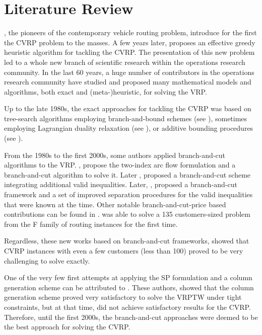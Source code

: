 \section{Literature Review}
\label{sec:intro-literature-review}

\textcite{dantzig1959},
the pioneers of the contemporary vehicle routing problem,
introduce for the first the CVRP problem to the masses.
A few years later, \textcite{clarke1964} proposes
an effective greedy heuristic algorithm for tackling the CVRP.
The presentation of this new problem led to a whole new branch
of scientific research within the operations research community.
In the last 60 years, a huge number of contributors in
the operations research community have studied and proposed many
mathematical models and algorithms, both exact and (meta-)heuristic,
for solving the VRP.

Up to the late 1980s, the exact approaches for tackling the CVRP was
based on tree-search algorithms employing branch-and-bound schemes
(see \textcite{pierce1969, christofides1969a, christofides1981, laporte1986}),
sometimes employing Lagrangian duality relaxation (see \textcite{fisher1994a, miller1995}),
or additive bounding procedures (see \textcite{fischetti1994a, hadjiconstantinou1995}).

From the 1980s to the first 2000s, some authors applied branch-and-cut
algorithms to the VRP.
\textcite{laporte1983, laporte1985}, propose the two-index arc flow formulation
and a branch-and-cut algorithm to solve it.
Later \textcite{augerat1995a}, proposed a branch-and-cut scheme
integrating additional valid inequalities.
Later, \textcite{lysgaard2004},
proposed a branch-and-cut framework and
a set of improved separation procedures for
the valid inequalities that were known at the time.
Other notable branch-and-cut-price based contributions
can be found in \textcite{araqueg1994, augerat1995, achuthan1996, blasum2000, ralphs2003, achuthan2003, baldacci2004}.
\citeauthor{baldacci2004} was able to solve a
135 customers-sized problem from the F family of routing instances \textcite{fisher1994}
for the first time.

Regardless, these new works based on branch-and-cut frameworks, showed that CVRP instances
with even a few customers (less than 100) proved
to be very challenging to solve exactly.


One of the very few first attempts at applying
the SP formulation and a column generation scheme can
be attributed to \textcite{desrosiers1984, agarwal1989}.
These authors, showed that the column generation scheme proved
very satisfactory to solve the VRPTW under tight constraints,
but at that time, did not achieve satisfactory results for the CVRP.
Therefore, until the first 2000s, the branch-and-cut approaches
were deemed to be the best approach for solving the CVRP.

